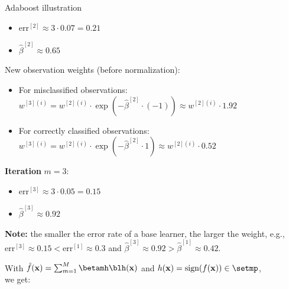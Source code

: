 \documentclass[11pt,compress,t,notes=noshow, xcolor=table]{beamer}
\begin{document}
\begin{vbframe}{Adaboost illustration}
\begin{minipage}[c]{0.6\textwidth}
\begin{footnotesize}
\begin{itemize}
    \item $\text{err}^{[2]} \approx 3 \cdot 0.07 = 0.21$ 
    \item $\hat{\beta}^{[2]} \approx 0.65$
  \end{itemize}
  New observation weights (before normalization):
  \begin{itemize}
    \item For misclassified observations:
      $w^{[3](i)} = w^{[2](i)} \cdot \exp \left(-\hat \beta^{[2]} \cdot (-1) 
      \right) \approx w^{[2](i)} \cdot 1.92$
    \item For correctly classified observations:
      $w^{[3](i)} = w^{[2](i)} \cdot \exp \left(-\hat \beta^{[2]} \cdot 1
            \right) \approx w^{[2](i)} \cdot 0.52$
  \end{itemize}
  \textbf{Iteration} $m = 3$:
  \begin{itemize}
    \item $\text{err}^{[3]} \approx 3 \cdot 0.05 = 0.15$
    \item $\hat{\beta}^{[3]} \approx 0.92$
  \end{itemize}
  \end{footnotesize}
\end{minipage}

\vfill

\begin{footnotesize}
\textbf{Note:} the smaller the error rate of a base learner, the larger the 
weight, e.g., $\text{err}^{[3]} \approx 0.15 < \text{err}^{[1]} \approx 0.3$ 
and $\hat \beta^{[3]} \approx 0.92 > \hat \beta^{[1]} \approx 0.42.$
\end{footnotesize}

\framebreak


With $\fxh = \sum_{m=1}^{M} \betamh \blh(\xv)$ and $h(\xv) = \text{sign}(\fx) 
\in \setmp$, \\we get:


\end{vbframe}
\end{document}
